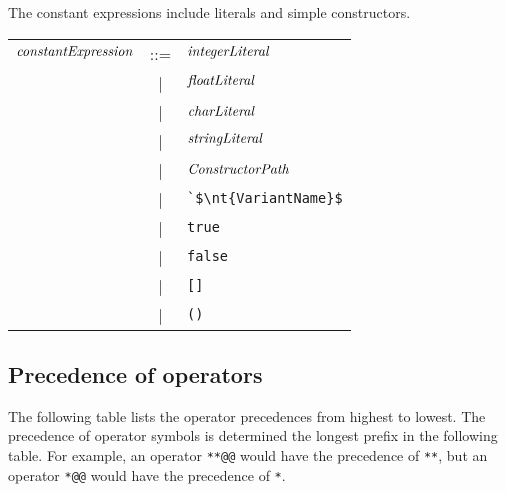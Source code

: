 The constant expressions include literals and simple constructors.

\begin{center}
\begin{tabular}{rcl}
$\textit{\rmfamily constantExpression}$ & ::= & $\textit{\rmfamily integerLiteral}$\\
& | & $\textit{\rmfamily floatLiteral}$\\
& | & $\textit{\rmfamily charLiteral}$\\
& | & $\textit{\rmfamily stringLiteral}$\\
& | & $\textit{\rmfamily ConstructorPath}$\\
& | & \hbox{\lstinline/`$\nt{VariantName}$/}\\
& | & \hbox{\lstinline/true/}\\
& | & \hbox{\lstinline/false/}\\
& | & \hbox{\lstinline/[]/}\\
& | & \hbox{\lstinline/()/}
\end{tabular}
\end{center}

\subsection{Precedence of operators}

The following table lists the operator precedences from highest to lowest.
The precedence of operator symbols is determined the longest prefix in the following table.
For example, an operator \hbox{\lstinline/**@@/} would have the precedence of \hbox{\lstinline/**/},
but an operator \hbox{\lstinline/*@@/} would have the precedence of \hbox{\lstinline/*/}.


